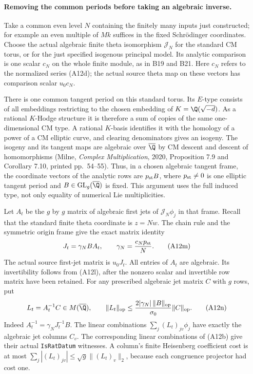 \paragraph{Removing the common periods before taking an algebraic inverse.}
Take a common even level $N$ containing the finitely many
inputs just constructed; for example an even multiple
of $Mk$ suffices in the fixed Schr\"odinger coordinates.
Choose the actual algebraic finite theta isomorphism
$\mathcal J_N$ for the standard CM torus, or for the
just specified isogenous principal model.  Its analytic
comparison is one scalar $c_N$ on the whole finite
module, as in B19 and B21.  Here $c_N$ refers to the
normalized series (A12d); the actual source theta map
on these vectors has comparison scalar $u_0c_N$.

There is one common tangent period on this standard
torus.  Its $E$-type consists of all embeddings restricting
to the chosen embedding of $K=\Q(\sqrt{-d})$.  As a
rational $K$-Hodge structure it is therefore a sum of
copies of the same one-dimensional CM type.  A rational
$K$-basis identifies it with the homology of a power
of a CM elliptic curve, and clearing denominators
gives an isogeny.  The isogeny and its tangent maps are
algebraic over $\overline\Q$ by CM descent and descent
of homomorphisms (Milne, \emph{Complex Multiplication},
2020, Proposition 7.9 and Corollary 7.10, printed
pp.~54--55).  Thus, in a chosen algebraic tangent
frame, the coordinate vectors of the analytic rows
are $p_{\rm st}B$, where $p_{\rm st}\ne0$ is one
elliptic tangent period and
$B\in\operatorname{GL}_g(\overline\Q)$ is fixed.
This argument uses the full induced type, not only
equality of numerical Lie multiplicities.

Let $A_t$ be the $g$ by $g$ matrix of algebraic first
jets of $\mathcal J_N\phi_j$ in that frame.  Recall
that the standard finite theta coordinate is $z=Nw$.
The chain rule and the symmetric origin frame give
the exact matrix identity
\[
       J_t=\gamma_N B A_t,
             \qquad \gamma_N=\frac{c_Np_{\rm st}}{N}.
 \tag{A12m}
\]
The actual source first-jet matrix is $u_0J_t$.
All entries of $A_t$ are algebraic.  Its invertibility
follows from (A12l), after the nonzero scalar and
invertible row matrix have been retained.  For any
prescribed algebraic jet matrix $C$ with $g$ rows,
put
\[
         L_t=A_t^{-1}C\in M(\overline\Q),
 \qquad
 \|L_t\|_{\rm op}\leq
       \frac{2|\gamma_N|\,\|B\|_{\rm op}}{\sigma_0}
                         \|C\|_{\rm op}.
 \tag{A12n}
\]
Indeed $A_t^{-1}=\gamma_NJ_t^{-1}B$.  The linear
combinations $\sum_j(L_t)_{jv}\phi_j$ have exactly
the algebraic jet columns $C_v$.  The corresponding
linear combinations of (A12b) give their actual
\texttt{IsRatDatum} witnesses.  A column's finite
Heisenberg coefficient cost is at most
$\sum_j|(L_t)_{jv}|\leq\sqrt g\|(L_t)_v\|_2$,
because each congruence projector had cost one.


